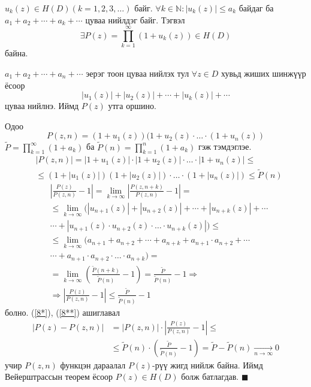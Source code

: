 \begin{thm}
$u_k(z)\in H(D)(k=1,2,3,\ldots)$ байг. $\forall k\in\mathbb{N}:|u_k(z)|\leq a_k$ байдаг ба $a_1+a_2+\cdots +a_k+\cdots$ цуваа нийлдэг байг. Тэгвэл  
$$\exists P(z)=\prod\limits_{k=1}^\infty (1+u_k(z))\in H(D)$$ байна.
\end{thm}
\begin{prf}
$a_1+a_2+\cdots +a_n+\cdots$ эерэг тоон цуваа нийлэх тул $\forall z\in D$ хувьд жиших шинжүүр ёсоор $$|u_1(z)|+|u_2(z)|+\cdots +|u_k(z)|+\cdots$$
цуваа нийлнэ. Иймд $P(z)$ утга оршино.

Одоо $$P(z,n)=(1+u_1(z))(1+u_2(z)\cdot \ldots \cdot(1+u_n(z))$$
$\tilde{P}=\prod\limits_{k=1}^\infty (1+a_k)$ ба $\tilde{P}(n)=\prod\limits_{k=1}^n (1+a_k)$ гэж тэмдэглэе.
\begin{equation}
    \tag{$*$} \label{8*}
    \begin{split}
        &|P(z,n)|=|1+u_1(z)|\cdot |1+u_2(z)|\cdot \ldots \cdot |1+u_n(z)|\leq \\
        &\leq (1+|u_1(z)|)(1+|u_2(z)|)\cdot \ldots \cdot (1+|u_n(z)|)\leq \tilde{P}(n)
    \end{split}
\end{equation}
\begin{equation}
    \tag{$**$} \label{8**}
    \begin{split}
    &\left|\frac{P(z)}{P(z,n)}-1\right|=\lim\limits_{k\rightarrow\infty}\left|\frac{P(z,n+k)}{P(z,n)}-1\right|=\\
        &\leq\lim\limits_{k\rightarrow\infty}(|u_{n+1}(z)|+ |u_{n+2}(z)|+ \cdots + |u_{n+k}(z)|+\cdots \\
        &\cdots +|u_{n+1}(z)\cdot u_{n+2}(z)\cdot \ldots \cdot u_{n+k}(z)|)\leq\\
        &\leq \lim\limits_{k\rightarrow \infty} (a_{n+1}+a_{n+2}+\cdots +a_{n+k}+a_{n+1}\cdot a_{n+2}+\cdots\\
        &\cdots +a_{n+1}\cdot a_{n+2}\cdot \ldots \cdot a_{n+k})= \\
        &=\lim\limits_{k\rightarrow \infty}\left(\frac{\tilde{P}(n+k)}{\tilde{P}(n)}-1\right) =\frac{\tilde{P}}{\tilde{P}(n)}-1\Rightarrow \\
        &\Rightarrow \left|\frac{P(z)}{P(z,n)}-1\right|\leq \frac{\tilde{P}}{\tilde{P}(n)}-1
    \end{split}
\end{equation}
болно. (\ref{8*}), (\ref{8**}) ашиглавал
\begin{align*}
    |P(z)-P(z,n)|&=|P(z,n)|\cdot \left|\frac{P(z)}{P(z,n)}-1\right| \leq \\
    &\leq \tilde{P}(n)\cdot \left(\frac{\tilde{P}}{\tilde{P}(n)}-1\right) =\tilde{P}-\tilde{P}(n)\xrightarrow[n\rightarrow\infty]{} 0
\end{align*}
учир $P(z,n)$ функцэн дараалал $P(z)$-рүү жигд нийлж байна. Иймд Вейерштрассын теорем ёсоор $P(z)\in H(D)$ болж батлагдав.
\hfill $\blacksquare$\end{prf}

